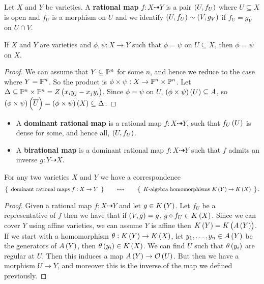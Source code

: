 
\begin{definition}
Let $ X $ and $ Y $ be varieties. A \textbf{rational map} $ f : X \dashrightarrow Y $ is a pair $ \br{U, f_U} $ where $ U \subseteq X $ is open and $ f_U $ is a morphism on $ U $ and we identify $ \br{U, f_U} \sim \br{V, g_V} $ if $ f_U = g_V $ on $ U \cap V $.
\end{definition}

\begin{lemma}
If $ X $ and $ Y $ are varieties and $ \phi, \psi : X \to Y $ such that $ \phi = \psi $ on $ U \subseteq X $, then $ \phi = \psi $ on $ X $.
\end{lemma}

\begin{proof}
We can assume that $ Y \subseteq \mathbb{P}^n $ for some $ n $, and hence we reduce to the case where $ Y = \mathbb{P}^n $. So the product is $ \phi \times \psi : X \to \mathbb{P}^n \times \mathbb{P}^n $. Let $ \Delta \subseteq \PP^n \times \PP^n = Z\br{x_iy_j - x_jy_i} $. Since $ \phi = \psi $ on $ U $, $ \br{\phi \times \psi}\br{U} \subseteq A $, so $ \br{\phi \times \psi}\br{\overline{U}} = \br{\phi \times \psi}\br{X} \subseteq \Delta $.
\end{proof}

\begin{definition}
\hfill
\begin{itemize}
\item A \textbf{dominant rational map} is a rational map $ f : X \dashrightarrow Y $, such that $ f_U\br{U} $ is dense for some, and hence all, $ \br{U, f_U} $.
\item A \textbf{birational map} is a dominant rational map $ f : X \dashrightarrow Y $ such that $ f $ admits an inverse $ g : Y \dashrightarrow X $.
\end{itemize}
\end{definition}

\begin{theorem}
For any two varieties $ X $ and $ Y $ we have a correspondence
$$ \correspondence{\text{dominant rational maps} \ f : X \to Y}{K \text{-algebra homomorphisms} \ K\br{Y} \to K\br{X}}. $$
\end{theorem}

\begin{proof}
Given a rational map $ f : X \dashrightarrow Y $ and let $ g \in K\br{Y} $. Let $ f_U $ be a representative of $ f $ then we have that if $ \br{V, g} = g $, $ g \circ f_U \in K\br{X} $. Since we can cover $ Y $ using affine varieties, we can assume $ Y $ is affine then $ K\br{Y} = K\br{A\br{Y}} $. If we start with a homomorphism $ \theta : K\br{Y} \to K\br{X} $, let $ y_1, \dots, y_n \in A\br{Y} $ be the generators of $ A\br{Y} $, then $ \theta\br{y_i} \in K\br{X} $. We can find $ U $ such that $ \theta\br{y_i} $ are regular at $ U $. Then this induces a map $ A\br{Y} \to \OOO\br{U} $. But then we have a morphism $ U \to Y $, and moreover this is the inverse of the map we defined previously.
\end{proof}

